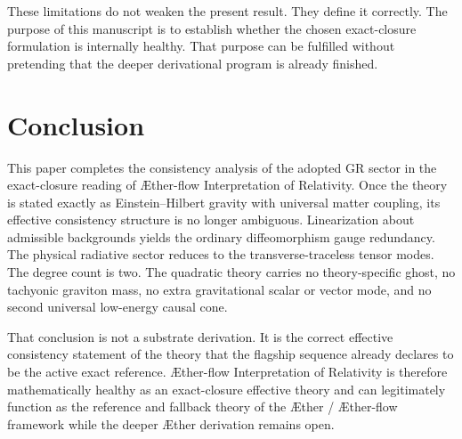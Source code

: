 \documentclass[11pt]{article}
\newcommand{\Aether}{\AE{}ther}
\newcommand{\Aflow}{\AE{}ther-flow}
\newcommand{\TheoryName}{\Aflow{} Interpretation of Relativity}
\newcommand{\TheoryProgram}{\Aether{} / \Aflow{} framework}
\begin{document}
These limitations do not weaken the present result. They define it correctly. The purpose of this manuscript is to establish whether the chosen exact-closure formulation is internally healthy. That purpose can be fulfilled without pretending that the deeper derivational program is already finished.

\section{Conclusion}

This paper completes the consistency analysis of the adopted GR sector in the exact-closure reading of \TheoryName{}. Once the theory is stated exactly as Einstein--Hilbert gravity with universal matter coupling, its effective consistency structure is no longer ambiguous. Linearization about admissible backgrounds yields the ordinary diffeomorphism gauge redundancy. The physical radiative sector reduces to the transverse-traceless tensor modes. The degree count is two. The quadratic theory carries no theory-specific ghost, no tachyonic graviton mass, no extra gravitational scalar or vector mode, and no second universal low-energy causal cone.

That conclusion is not a substrate derivation. It is the correct effective consistency statement of the theory that the flagship sequence already declares to be the active exact reference. \TheoryName{} is therefore mathematically healthy as an exact-closure effective theory and can legitimately function as the reference and fallback theory of the \TheoryProgram{} while the deeper \Aether{} derivation remains open.


\end{document}
